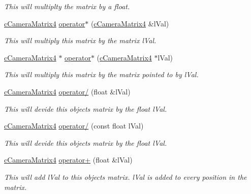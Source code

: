 \begin{DoxyCompactItemize}
\begin{DoxyCompactList}\small\item\em This will multiplty the matrix by a float. \item\end{DoxyCompactList}\item 
\hyperlink{classc_camera_matrix4}{cCameraMatrix4} \hyperlink{classc_camera_matrix4_ac3ca3f392c5046dd428cfe8cde194d37}{operator$\ast$} (\hyperlink{classc_camera_matrix4}{cCameraMatrix4} \&lVal)
\begin{DoxyCompactList}\small\item\em This will multiply this matrix by the matrix lVal. \item\end{DoxyCompactList}\item 
\hyperlink{classc_camera_matrix4}{cCameraMatrix4} $\ast$ \hyperlink{classc_camera_matrix4_a67a5947084f07eae0dd698477e1a7689}{operator$\ast$} (\hyperlink{classc_camera_matrix4}{cCameraMatrix4} $\ast$lVal)
\begin{DoxyCompactList}\small\item\em This will multiply this matrix by the matrix pointed to by lVal. \item\end{DoxyCompactList}\item 
\hyperlink{classc_camera_matrix4}{cCameraMatrix4} \hyperlink{classc_camera_matrix4_a71c4f0d6ee680f0cd511354de0033c64}{operator/} (float \&lVal)
\begin{DoxyCompactList}\small\item\em This will devide this objects matrix by the float lVal. \item\end{DoxyCompactList}\item 
\hyperlink{classc_camera_matrix4}{cCameraMatrix4} \hyperlink{classc_camera_matrix4_ab8d3c0c3df306102db000c37323692a3}{operator/} (const float lVal)
\begin{DoxyCompactList}\small\item\em This will devide this objects matrix by the float lVal. \item\end{DoxyCompactList}\item 
\hyperlink{classc_camera_matrix4}{cCameraMatrix4} \hyperlink{classc_camera_matrix4_a97ada5a5b0698d4e8f383754f30cbd2b}{operator+} (float \&lVal)
\begin{DoxyCompactList}\small\item\em This will add lVal to this objects matrix. lVal is added to every position in the matrix. \item\end{DoxyCompactList}\item 

\end{DoxyCompactItemize}
